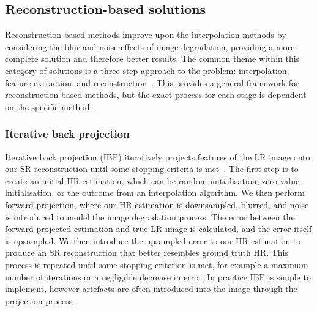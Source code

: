 \subsection{Reconstruction-based solutions}
Reconstruction-based methods improve upon the interpolation methods by considering the blur and noise effects of image degradation, providing a more complete solution and therefore better results. The common theme within this category of solutions is a three-step approach to the problem: interpolation, feature extraction, and reconstruction~\cite{superResRemoteSensingOverview}. This provides a general framework for reconstruction-based methods, but the exact process for each stage is dependent on the specific method~\cite{superResRemoteSensingOverview}.

\subsubsection{Iterative back projection}
Iterative back projection (IBP) iteratively projects features of the LR image onto our SR reconstruction until some stopping criteria is met~\cite{ibp}. The first step is to create an initial HR estimation, which can be random initialisation, zero-value initialisation, or the outcome from an interpolation algorithm. We then perform forward projection, where our HR estimation is downsampled, blurred, and noise is introduced to model the image degradation process. The error between the forward projected estimation and true LR image is calculated, and the error itself is upsampled. We then introduce the upsampled error to our HR estimation to produce an SR reconstruction that better resembles ground truth HR. This process is repeated until some stopping criterion is met, for example a maximum number of iterations or a negligible decrease in error. In practice IBP is simple to implement, however artefacts are often introduced into the image through the projection process~\cite{ibp}.

